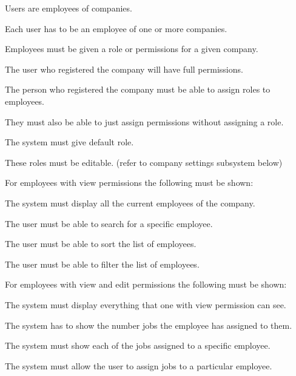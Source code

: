 \documentclass{article}
\begin{document}
	\begin{list}{R.}{}
		\item Users are employees of companies.
		\item Each user has to be an employee of one or more companies. 
		\item Employees must be given a role or permissions for a given company.
		\begin{list}{R.}{}
			\item The user who registered the company will have full permissions.
			\item The person who registered the company must be able to assign roles to employees.
			\item They must also be able to just assign permissions without assigning a role.
			\item The system must give default role.
			\item These roles must be editable. (refer to company settings subsystem below)
		\end{list}		
		\item For employees with view permissions the following must be shown: 
		\begin{list}{R.}{}
			\item The system must display all the current employees of the company.
			\item The user must be able to search for a specific employee.
			\item The user must be able to sort the list of employees.
			\item The user must be able to filter the list of employees.
		\end{list}
		\item For employees with view and edit permissions the following must be shown: 
		\begin{list}{R.}{}
			\item The system must display everything that one with view permission can see.
			\item The system has to show the number jobs the employee has assigned to them.
			\item The system must show each of the jobs assigned to a specific employee.
			\item The system must allow the user to assign jobs to a particular employee.
		\end{list}			
	\end{list}
	
\end{document}
